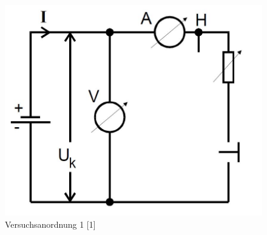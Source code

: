 	\begin{figure}[h]
		\begin{center}
		\includegraphics[scale=0.3]{pic2.jpg}
		\caption{Versuchsanordnung 1 [1]}
		\label{pic2}
		\end{center}	
	\end{figure}